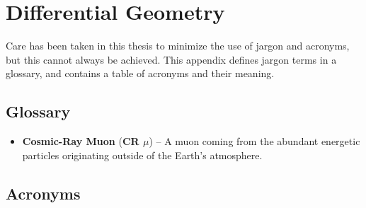 
\chapter{Differential Geometry}
\label{app_geometry}





Care has been taken in this thesis to minimize the use of jargon and
acronyms, but this cannot always be achieved.  This appendix defines
jargon terms in a glossary, and contains a table of acronyms and their
meaning.

\section{Glossary}
\label{jargonapp}
\begin{itemize}

\item \textbf{Cosmic-Ray Muon} (\textbf{CR $\mu$}) -- A muon coming from
the abundant energetic particles originating outside of the Earth's
atmosphere.

\end{itemize}

\section{Acronyms}
\label{acronymsec}


